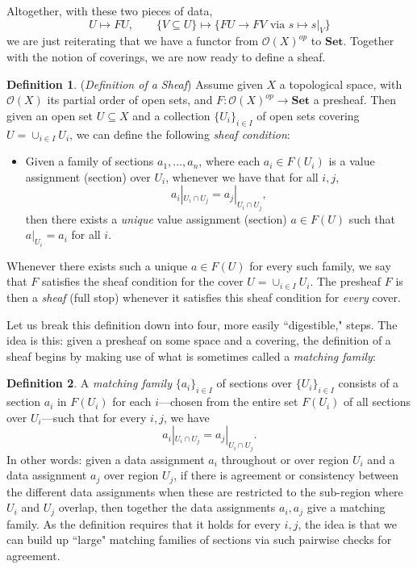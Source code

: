 \documentclass[11pt]{book}
\theoremstyle{definition}
\theoremstyle{definition}
\newtheorem{definition}{Definition}[section]
\theoremstyle{definition}
\theoremstyle{theorem}
\theoremstyle{definition}
\begin{document}
		Altogether, with these two pieces of data, 
		\begin{equation}
		U \mapsto FU, \hspace{2em} \{V \subseteq U\} \mapsto \{FU \rightarrow FV \text{ via } s \mapsto s|_V \}
		\end{equation}
		we are just reiterating that we have a functor from $\mathscr{O}(X)^{op}$ to $\textbf{Set}$. Together with the notion of coverings, we are now ready to define a sheaf. 
			\begin{definition}
			(\textit{Definition of a Sheaf}) Assume given $X$ a topological space, with $\mathscr{O}(X)$ its partial order of open sets, and $F: \mathscr{O}(X)^{op} \rightarrow \textbf{Set}$ a presheaf. Then given an open set $U \subseteq  X$ and a collection $\{U_i\}_{i \in I}$ of open sets covering $U = \cup_{i \in I} U_i$, we can define the following \textit{sheaf condition}: 
			\begin{itemize}
				\item Given a family of sections $a_1, \dots, a_n$, where each $a_i \in F(U_i)$ is a value assignment (section) over $U_i$, whenever we have that for all $i, j$,
				\begin{equation*} a_i|_{U_i \cap U_j} = a_j|_{U_i \cap U_j}, 
				\end{equation*}
				then there exists a \textit{unique} value assignment (section) $a \in F(U)$ such that $a|_{U_i} = a_i$ for all $i$. 
			\end{itemize}  
			Whenever there exists such a unique $a \in F(U)$ for every such family, we say that $F$ satisfies the sheaf condition for the cover $U = \cup_{i \in I} U_i$.
			The presheaf $F$ is then a \textit{sheaf} (full stop) whenever it satisfies this sheaf condition for \textit{every} cover. 
		\end{definition}
			Let us break this definition down into four, more easily ``digestible," steps. The idea is this: given a presheaf on some space and a covering, the definition of a sheaf begins by making use of what is sometimes called a \textit{matching family}:
			\begin{definition}
				A \textit{matching family} $\{a_i\}_{i \in I}$ of sections over $\{U_i\}_{i \in I}$ consists of a section $a_i$ in $F(U_i)$ for each $i$---chosen from the entire set $F(U_i)$ of all sections over $U_i$---such that for every $i, j$, we have 
				\begin{equation*}
				a_i|_{U_i \cap U_j} = a_j|_{U_i \cap U_j}.
				\end{equation*} 
				In other words: given a data assignment $a_i$ throughout or over region $U_i$ and a data assignment $a_j$ over region $U_j$, if there is agreement or consistency between the different data assignments when these are restricted to the sub-region where $U_i$ and $U_j$ overlap, then together the data assignments $a_i, a_j$ give a matching family. As the definition requires that it holds for every $i, j$, the idea is that we can build up ``large" matching families of sections via such pairwise checks for agreement. 
			\end{definition}  
\end{document}
